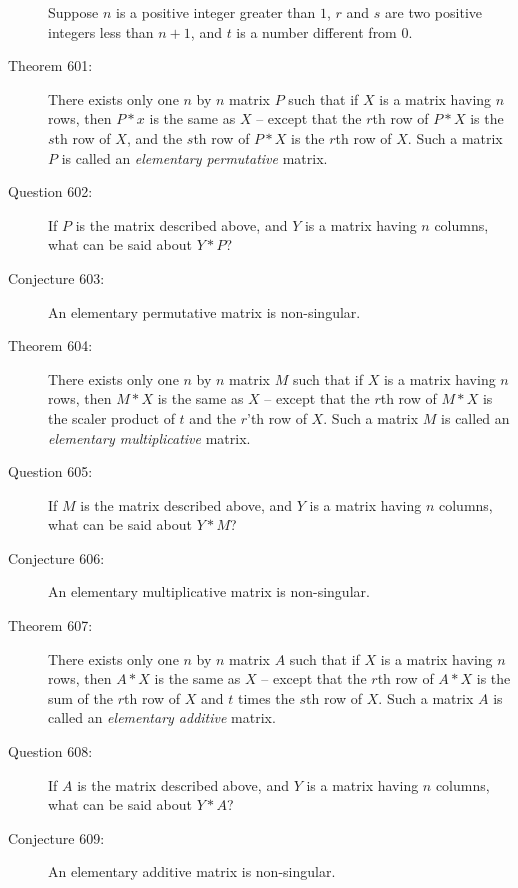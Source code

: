 \documentclass{article}
\begin{document}
\begin{description}

  \item[] Suppose $n$ is a positive integer greater than $1$, $r$ and $s$ are two positive integers less than $n+1$, and $t$ is a number different from $0$.

  \item[Theorem 601:] There exists only one $n$ by $n$ matrix $P$ such that if $X$ is a matrix having $n$ rows, then $P*x$ is the same as $X$ -- except that the $r$th row of $P*X$ is the $s$th row of $X$, and the $s$th row of $P*X$ is the $r$th row of $X$. Such a matrix $P$ is called an \emph{elementary permutative} matrix.

  \item[Question 602:] If $P$ is the matrix described above, and $Y$ is a matrix having $n$ columns, what can be said about $Y*P$?

  \item[Conjecture 603:] An elementary permutative matrix is non-singular.

  \item[Theorem 604:] There exists only one $n$ by $n$ matrix $M$ such that if $X$ is a matrix having $n$ rows, then $M*X$ is the same as $X$ -- except that the $r$th row of $M*X$ is the scaler product of $t$ and the $r$'th row of $X$. Such a matrix $M$ is called an \emph{elementary multiplicative} matrix.

  \item[Question 605:] If $M$ is the matrix described above, and $Y$ is a matrix having $n$ columns, what can be said about $Y*M$?

  \item[Conjecture 606:] An elementary multiplicative matrix is non-singular.

  \item[Theorem 607:] There exists only one $n$ by $n$ matrix $A$ such that if $X$ is a matrix having $n$ rows, then $A*X$ is the same as $X$ -- except that the $r$th row of $A*X$ is the sum of the $r$th row of $X$ and $t$ times the $s$th row of $X$. Such a matrix $A$ is called an \emph{elementary additive} matrix.

  \item[Question 608:] If $A$ is the matrix described above, and $Y$ is a matrix having $n$ columns, what can be said about $Y*A$?

  \item[Conjecture 609:] An elementary additive matrix is non-singular.


\end{description}
\end{document}
